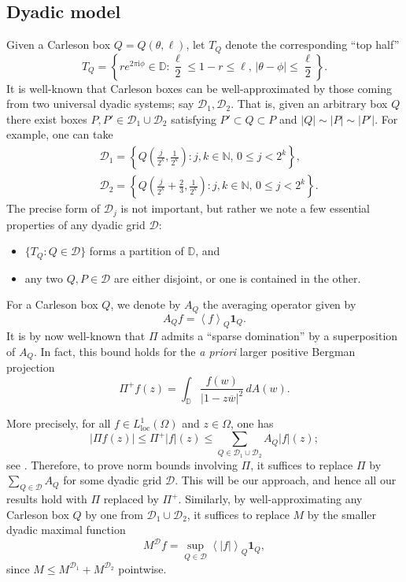 \documentclass{amsart}
\newcommand{\abs}[1]{\left\vert {#1}\right\vert}
\newcommand{\avg}[1]{\left\langle {#1}\right\rangle}
\theoremstyle{definition}
\numberwithin{equation}{section}
\begin{document}
\subsection{Dyadic model}
\label{ss:dyad}
Given a Carleson box $Q=Q(\theta,\ell)$, let $T_Q$ denote the corresponding ``top half''
\[ T_Q=\left \{re^{2\pi\mathrm{i} \phi} \in \mathbb{D}\colon \frac{\ell}{2} \leq 1-r \leq \ell,\, |\theta-\phi| \leq \frac{\ell}{2} \right\}.\]
It is well-known that Carleson boxes can be well-approximated by those coming from two universal dyadic systems; say $\mathcal{D}_1, \mathcal{D}_2.$ That is, given an arbitrary box $Q$ there exist boxes $P,P' \in \mathcal{D}_1 \cup \mathcal{D}_2$ satisfying $P' \subset Q \subset P$ and $|Q| \sim |P| \sim |P'|.$ For example, one can take 
\begin{align*}
&\mathcal{D}_1= \left\{Q\left(\tfrac{j}{2^k},\tfrac{1}{2^k}\right) \colon j,k \in \mathbb{N}, \, 0 \leq j< 2^k \right\},\\
&\mathcal{D}_2= \left\{Q\left( \tfrac{j}{2^k} + \tfrac{2}{3}, \tfrac{1}{2^k}\right) \colon j,k \in \mathbb{N}, \,0 \leq j< 2^k\right\}.\end{align*}
The precise form of $\mathcal D_j$ is not important, but rather we note a few essential properties of any dyadic grid $\mathcal D$:
\begin{itemize}
	\item[(i)] $\{T_Q \colon Q \in \mathcal D\}$ forms a partition of $\mathbb D$, and
	\item[(ii)] any two $Q,P \in \mathcal D$ are either disjoint, or one is contained in the other.
\end{itemize}

For a Carleson box $Q$, we denote by $A_Q$ the averaging operator given by 
	\[ A_Q f = \avg{f}_Q \mathbf 1_Q.\]
It is by now well-known that $\Pi$ admits a ``sparse domination'' by a superposition of $A_Q$. In fact, this bound holds for the \textit{a priori} larger positive Bergman projection 
    \[ \Pi^+ f(z) = \int_{\mathbb D} \frac{f(w)}{|1-z\overline{w}|^2} \, dA(w).\] 

More precisely, for all $f \in L^1_{\text{loc}}(\Omega)$ and $z \in \Omega$, one has 
    \begin{equation}\label{e:sparse} \abs{\Pi f(z) } \le \Pi^+ |f|(z) \le \sum_{Q \in \mathcal D_1 \cup \mathcal D_2} A_Q|f|(z);\end{equation}
 see \cites{PR13, RTW17}. 
Therefore, to prove norm bounds involving $\Pi$, it suffices to replace $\Pi$ by $\sum_{Q \in \mathcal D} A_Q$ for some dyadic grid $\mathcal D$. This will be our approach, and hence all our results hold with $\Pi$ replaced by $\Pi^+$. Similarly, by well-approximating any Carleson box $Q$ by one from $\mathcal D_1 \cup \mathcal D_2$, it suffices to replace $M$ by the smaller dyadic maximal function
    \[ M^{\mathcal D}f = \sup_{Q \in \mathcal D} \avg{|f|}_Q \mathbf 1_Q,\] 
since $M \le M^{\mathcal D_1} + M^{\mathcal D_2}$ pointwise.
\end{document}
